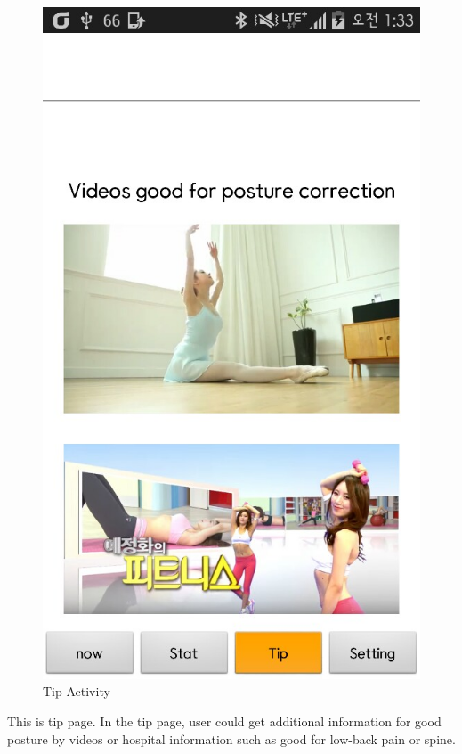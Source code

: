\documentclass[conference]{IEEEtran}
\begin{document}
 \begin{figure}[H]
\begin{center}
    \includegraphics[scale=0.4]{tip}
    \caption{Tip Activity} 
\end{center}
\end{figure}

This is tip page. In the tip page, user could get additional information for good posture by videos or hospital information such as good for low-back pain or spine.
\end{document}
